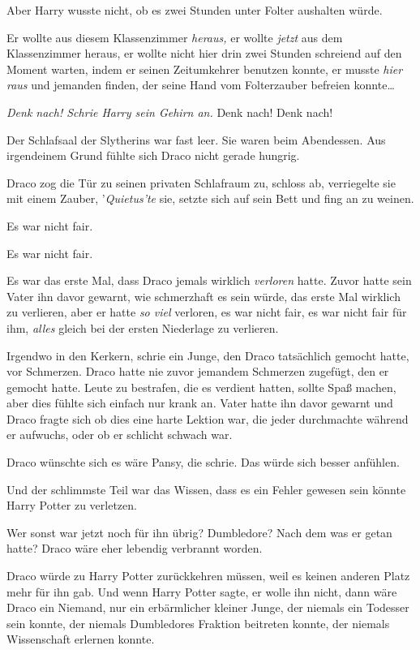 {Aber Harry wusste nicht, ob es zwei Stunden unter Folter aushalten würde.

Er wollte aus diesem Klassenzimmer \emph{heraus,} er wollte \emph{jetzt} aus dem Klassenzimmer heraus, er wollte nicht hier drin zwei Stunden schreiend auf den Moment warten, indem er seinen Zeitumkehrer benutzen konnte, er musste \emph{hier raus} und jemanden finden, der seine Hand vom Folterzauber befreien konnte…

\emph{Denk nach! Schrie Harry sein Gehirn an.} Denk nach! Denk nach!

Der Schlafsaal der Slytherins war fast leer. Sie waren beim Abendessen. Aus irgendeinem Grund fühlte sich Draco nicht gerade hungrig.

Draco zog die Tür zu seinen privaten Schlafraum zu, schloss ab, verriegelte sie mit einem Zauber, '\emph{Quietus'te} sie, setzte sich auf sein Bett und fing an zu weinen.

Es war nicht fair.

Es war nicht fair.

Es war das erste Mal, dass Draco jemals wirklich \emph{verloren} hatte. Zuvor hatte sein Vater ihn davor gewarnt, wie schmerzhaft es sein würde, das erste Mal wirklich zu verlieren, aber er hatte \emph{so viel} verloren, es war nicht fair, es war nicht fair für ihm, \emph{alles} gleich bei der ersten Niederlage zu verlieren.

Irgendwo in den Kerkern, schrie ein Junge, den Draco tatsächlich gemocht hatte, vor Schmerzen. Draco hatte nie zuvor jemandem Schmerzen zugefügt, den er gemocht hatte. Leute zu bestrafen, die es verdient hatten, sollte Spaß machen, aber dies fühlte sich einfach nur krank an. Vater hatte ihn davor gewarnt und Draco fragte sich ob dies eine harte Lektion war, die jeder durchmachte während er aufwuchs, oder ob er schlicht schwach war.

Draco wünschte sich es wäre Pansy, die schrie. Das würde sich besser anfühlen.

Und der schlimmste Teil war das Wissen, dass es ein Fehler gewesen sein könnte Harry Potter zu verletzen.

Wer sonst war jetzt noch für ihn übrig? Dumbledore? Nach dem was er getan hatte? Draco wäre eher lebendig verbrannt worden.

Draco würde zu Harry Potter zurückkehren müssen, weil es keinen anderen Platz mehr für ihn gab. Und wenn Harry Potter sagte, er wolle ihn nicht, dann wäre Draco ein Niemand, nur ein erbärmlicher kleiner Junge, der niemals ein Todesser sein konnte, der niemals Dumbledores Fraktion beitreten konnte, der niemals Wissenschaft erlernen konnte.

}
